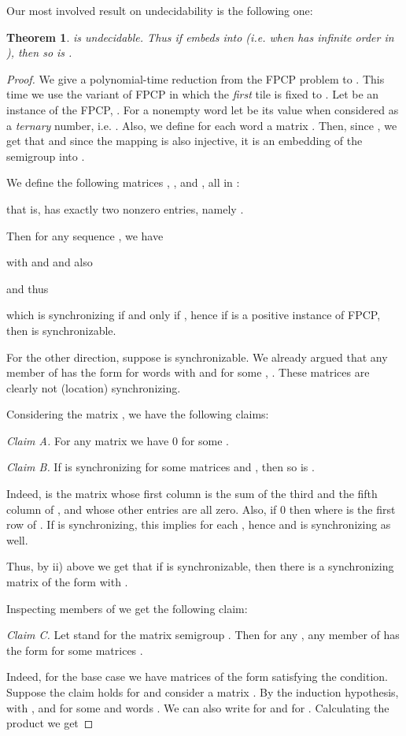 \documentclass[submission,copyright,creativecommons]{eptcs}
\theoremstyle{plain}
\newtheorem{theorem}{Theorem}
\theoremstyle{definition}
\theoremstyle{remark}
\begin{document}
Our most involved result on undecidability is the following one:
\begin{theorem}
\label{thm-n-sync}
 is undecidable.
Thus if  embeds into  (i.e. when  has infinite order in ), then so is .
\end{theorem}
\begin{proof}
We give a polynomial-time reduction from the FPCP problem to .
This time we use the variant of FPCP in which the \emph{first} tile is fixed to .
Let  be an instance of the FPCP, .
For a nonempty word  let  be its value when considered as a \emph{ternary} number, i.e.
.
Also, we define for each word  a matrix .
Then, since , we get that  and since the mapping 
is also injective, it is an embedding of the semigroup  into .

We define the following matrices , ,  and , all in :

that is,  has exactly two nonzero entries, namely .

Then for any sequence ,  we have

with  and  and also

and thus

which is synchronizing if and only if , hence if  is a positive
instance of FPCP, then  is synchronizable.

For the other direction, suppose  is synchronizable. We already argued that any member  of  has the form  for words  with  and
 for some , . These matrices are clearly not (location) synchronizing.

Considering the matrix , we have the following claims:

{\sl Claim A.} For any matrix  we have 0 for some .

{\sl Claim B.} If  is synchronizing for some matrices  and , then so is .

Indeed,  is the matrix whose first column is the sum of the third and the fifth column of , and whose other entries are all zero.
Also, if 0 then
 where  is the first row of .
If  is synchronizing, this implies  for each , hence  and  is synchronizing as well.

Thus, by ii) above we get that if  is synchronizable, then there is a synchronizing matrix of the form  with .

Inspecting members of  we get the following claim:

{\sl Claim C.} Let  stand for the matrix semigroup . Then for any , any member of
 has the form  for some
matrices .

Indeed, for the base case  we have matrices of the form 
satisfying the condition. Suppose the claim holds for  and consider a matrix . By the induction hypothesis,  with ,
and  for some  and words .
We can also write  for 
and  for .
Calculating the product we get


\end{proof}
\end{document}
